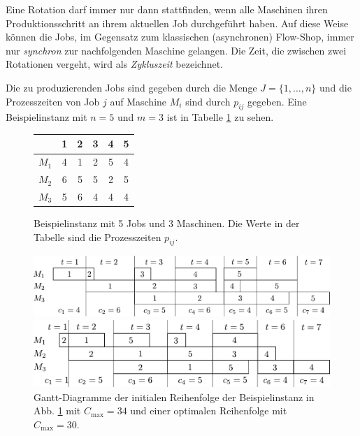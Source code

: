 \documentclass{scrreprt}
\begin{document}
Eine Rotation darf immer nur dann stattfinden, wenn alle Maschinen ihren Produktionsschritt an ihrem aktuellen Job
durchgeführt haben. Auf diese Weise können die Jobs, im Gegensatz zum klassischen (asynchronen) Flow-Shop, 
immer nur \textit{synchron} zur nachfolgenden Maschine gelangen.
Die Zeit, die zwischen zwei Rotationen vergeht, wird als \textit{Zykluszeit} bezeichnet.

Die zu produzierenden Jobs sind gegeben durch die Menge $J=\{1,\ldots,n\}$ 
und die Prozesszeiten von Job $j$ auf Maschine $M_i$ sind durch $p_{ij}$ gegeben.
Eine Beispielinstanz mit $n=5$ und $m=3$ ist in Tabelle \ref{abb:Bsp} zu sehen.
\begin{figure}[h]
    \begin{center}
        \begin{tabular}{c|ccccc}
                  & 1 & 2 & 3 & 4 & 5 \\ \hline
            $M_1$ & 4 & 1 & 2 & 5 & 4 \\ 
            $M_2$ & 6 & 5 & 5 & 2 & 5 \\
            $M_3$ & 5 & 6 & 4 & 4 & 4 
        \end{tabular}
    \end{center}
    \caption{
        \label{abb:Bsp}
        Beispielinstanz mit 5 Jobs und 3 Maschinen. Die Werte in der Tabelle sind die Prozesszeiten $p_{ij}$.
    }
\end{figure}
\begin{figure}
    \begin{center}
        \includegraphics[width=.8\textwidth]{graphics/bspinit.pdf}
    \end{center}
    \begin{center}
        \includegraphics[width=.8\textwidth]{graphics/bspopt.pdf}
    \end{center}
    \caption{
        \label{abb:gantt}
        Gantt-Diagramme der initialen Reihenfolge der Beispielinstanz in Abb. \ref{abb:Bsp} mit $C_{\max}=34$
        und einer optimalen Reihenfolge mit $C_{\max}=30$.
    }
\end{figure}
\end{document}
